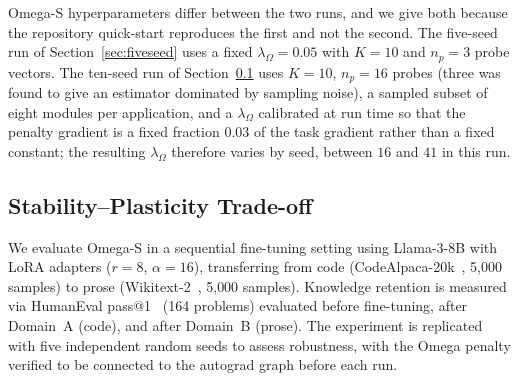 \documentclass[11pt,a4paper]{article}
\begin{document}
Omega-S hyperparameters differ between the two runs, and we give both because
the repository quick-start reproduces the first and not the second. The
five-seed run of Section~\ref{sec:fiveseed} uses a fixed
$\lambda_\Omega = 0.05$ with $K = 10$ and $n_p = 3$ probe vectors. The ten-seed
run of Section~\ref{sec:stability} uses $K = 10$, $n_p = 16$ probes (three was found
to give an estimator dominated by sampling noise), a sampled subset of eight
modules per application, and a $\lambda_\Omega$ calibrated at run time so that
the penalty gradient is a fixed fraction $0.03$ of the task gradient rather
than a fixed constant; the resulting $\lambda_\Omega$ therefore varies by seed,
between $16$ and $41$ in this run.

\subsection{Stability--Plasticity Trade-off}
\label{sec:stability}

We evaluate Omega-S in a sequential fine-tuning setting using Llama-3-8B
with LoRA adapters ($r{=}8$, $\alpha{=}16$), transferring from code
(CodeAlpaca-20k~\cite{codealpaca2023}, 5{,}000 samples) to prose
(Wikitext-2~\cite{merity2017pointer}, 5{,}000 samples).
Knowledge retention is measured via HumanEval pass@1~\cite{chen2021evaluating}
(164 problems) evaluated before fine-tuning, after Domain~A (code),
and after Domain~B (prose). The experiment is replicated with five
independent random seeds to assess robustness, with the Omega penalty
verified to be connected to the autograd graph before each run.
\end{document}

